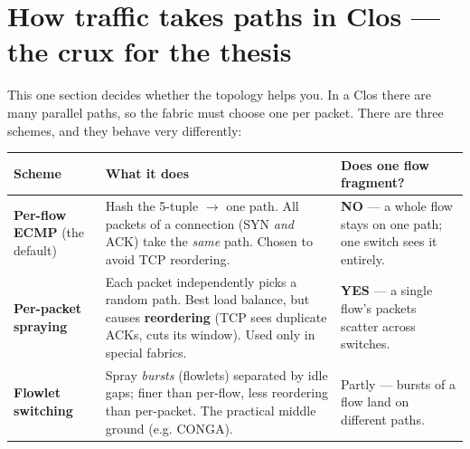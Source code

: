 \documentclass[11pt]{article}
\newcommand{\yes}{\textcolor{good}{\textbf{YES}}}
\newcommand{\no}{\textcolor{bad}{\textbf{NO}}}
\begin{document}
\begin{center}\end{center}

\section{How traffic takes paths in Clos --- the crux for the thesis}
This one section decides whether the topology helps you. In a Clos there are many parallel paths, so the
fabric must choose one per packet. There are three schemes, and they behave very differently:

\begin{center}
\begin{tabular}{@{}p{3.2cm}p{7.2cm}p{4.2cm}@{}}
\toprule
\textbf{Scheme} & \textbf{What it does} & \textbf{Does one flow fragment?}\\
\midrule
\textbf{Per-flow ECMP} (the default) & Hash the 5-tuple $\to$ one path. All packets of a connection
(SYN \emph{and} ACK) take the \emph{same} path. Chosen to avoid TCP reordering. & \no{} --- a whole flow
stays on one path; one switch sees it entirely.\\
\addlinespace
\textbf{Per-packet spraying} & Each packet independently picks a random path. Best load balance, but
causes \textbf{reordering} (TCP sees duplicate ACKs, cuts its window). Used only in special fabrics. &
\yes{} --- a single flow's packets scatter across switches.\\
\addlinespace
\textbf{Flowlet switching} & Spray \emph{bursts} (flowlets) separated by idle gaps; finer than per-flow,
less reordering than per-packet. The practical middle ground (e.g. CONGA). & Partly --- bursts of a flow
land on different paths.\\
\bottomrule
\end{tabular}
\end{center}
\end{document}
